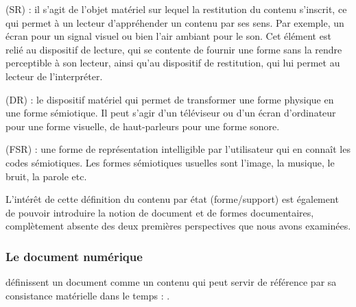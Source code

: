 \begin{listeni}
\begin{liste}
		\item {} (SR) : il s'agit de l'objet matériel sur lequel la restitution du contenu s'inscrit, ce qui permet à un lecteur d'appréhender un contenu par ses sens. 
		Par exemple, un écran pour un signal visuel ou bien l'air ambiant pour le son.
		Cet élément est relié au dispositif de lecture, qui se contente de fournir une forme sans la rendre perceptible à son lecteur, ainsi qu'au dispositif de restitution, qui lui permet au lecteur de l'interpréter.
		
		\item {} (DR) : le dispositif matériel qui permet de transformer une forme physique en une forme sémiotique.
		Il peut s'agir d'un téléviseur ou d'un écran d'ordinateur pour une forme visuelle, de haut-parleurs pour une forme sonore.
		
		\item {} (FSR) : une forme de représentation intelligible par l'utilisateur qui en connaît les codes sémiotiques.
		Les formes sémiotiques usuelles sont l'image, la musique, le bruit, la parole etc.
	\end{liste}
\end{listeni}

L'intérêt de cette définition du contenu par état (forme/support) est également de pouvoir introduire la notion de document et de formes documentaires, complètement absente des deux premières perspectives que nous avons examinées.


\subsubsection{Le document numérique}\label{sec:docnum}
\cite{Morizet-mahoudeaux2005a} définissent un document comme un contenu qui peut servir de référence par sa consistance matérielle dans le temps : .

